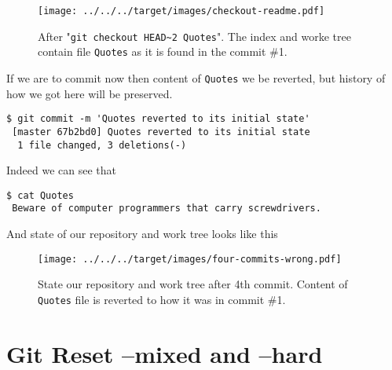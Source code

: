 \documentclass{article}
\theoremstyle{definition}
\begin{document}
        \begin{figure}[h]
        \centering\texttt{[image: ../../../target/images/checkout-readme.pdf]}
        \caption{After "\texttt{git checkout HEAD\textasciitilde2 Quotes}". The index and worke tree contain
          file \texttt{Quotes} as it is found in the commit \#1.\label{fig:checkout-readme}}
        \end{figure}

        \noindent If we are to commit now then content of \texttt{Quotes} we be reverted, but history of how we got
        here will be preserved.
        \begin{Verbatim}[frame=single]
 $ git commit -m 'Quotes reverted to its initial state'
 [master 67b2bd0] Quotes reverted to its initial state
  1 file changed, 3 deletions(-)
    \end{Verbatim}
    Indeed we can see that

        \begin{Verbatim}[frame=single]
 $ cat Quotes
 Beware of computer programmers that carry screwdrivers.
        \end{Verbatim}
        And state of our repository and work tree looks like this

        \begin{figure}[h]
        \centering\texttt{[image: ../../../target/images/four-commits-wrong.pdf]}
        \caption{State our repository and work tree after 4th commit. Content of \texttt{Quotes} file is reverted to
          how it was in commit \#1.\label{fig:4th-wrong-commit}}
        \end{figure}

        \section{Git Reset --mixed and --hard}
\end{document}
